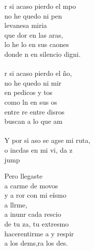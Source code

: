\begin{cancion}%
	r si acaso pierdo el mpo \\
	no he quedo ni pen \\
	levanesa miria \\
	que dor en las aras, \\
	lo he lo en sus caones \\
	donde n en silencio digni. \\
	\jump\\
	r si acaso pierdo el ño, \\
	no he quedo ni mir\\
	en pedicos y tos\\
	como ln en sus os \\
	entre re entre disros\\
	buscan  a lo que am \\
	\jump\\
	Y por si aso se agse mi ruta,\\
	o incdas en mi vi, da z\\jump\\
	\begin{chorus}%
	Pero llegaste   \\
	a carme de movos\\
	y a ror con mi eísmo\\
	a llrme, \\
	a inunr cada rescio\\
	de tu za, tu extresmo \\
	hacerentirme a y respir \\
	a los dems,ra los des. \\
	\end{chorus}%

\end{cancion}
